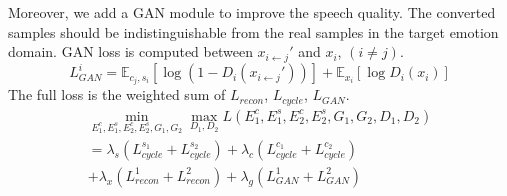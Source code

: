 \documentclass{article}
\begin{document}
Moreover, we add a GAN module to improve the speech quality. The converted samples should be indistinguishable from the real samples in the target emotion domain. GAN loss is computed between $x_{i\leftarrow j}'$ and $x_i$, $(i \neq j)$.
\begin{equation}
L_{GAN}^i = \mathbb{E}_{c_j, s_i}[\log(1-D_i(x_{i\leftarrow j}'))] + \mathbb{E}_{x_i}[\log D_i(x_i)]
\end{equation}
The full loss is the weighted sum of $L_{recon}$, $L_{cycle}$, $L_{GAN}$.
\begin{equation}
\begin{aligned}
\min_{E_1^c,E_1^s,E_2^c,E_2^s, G_1,G_2}\max_{D_1,D_2} L(E_1^c, E_1^s, E_2^c, E_2^s, G_1, G_2, D_1, D_2) \\
= \lambda_s (L_{cycle}^{s_1} + L_{cycle}^{s_2}) + \lambda_c (L_{cycle}^{c_1} + L_{cycle}^{c_2}) \ \qquad \qquad \\
+ \lambda_x (L_{recon}^1 + L_{recon}^2) + \lambda_g (L_{GAN}^1 + L_{GAN}^2) \qquad \quad
\end{aligned}
\end{equation}

%
%









\end{document}
